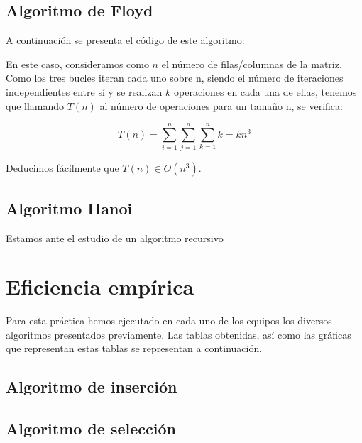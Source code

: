 \documentclass{homework}
\begin{document}
    \subsection{Algoritmo de Floyd}

    A continuación se presenta el código de este algoritmo:

    

    En este caso, consideramos como $n$ el número de filas/columnas de la matriz. Como los tres bucles iteran cada uno sobre n, siendo el número de iteraciones
    independientes entre sí y se realizan $k$ operaciones en cada una de ellas, tenemos que llamando $T(n)$ al número de operaciones para un tamaño n, se verifica:
    
    \begin{equation*}
        T(n) = \sum_{i=1}^n \sum_{j=1}^{n} \sum_{k=1}^{n} k = kn^3
    \end{equation*}

    Deducimos fácilmente que $T(n) \in O(n^3)$. 
    
    \subsection{Algoritmo Hanoi}
    
     

    Estamos ante el estudio de un algoritmo recursivo 

    \section{Eficiencia empírica}

    Para esta práctica hemos ejecutado en cada uno de los equipos los diversos algoritmos presentados previamente.
    Las tablas obtenidas, así como las gráficas que representan estas tablas se representan a continuación.

    \subsection{Algoritmo de inserción}
    \subsection{Algoritmo de selección}
\end{document}

